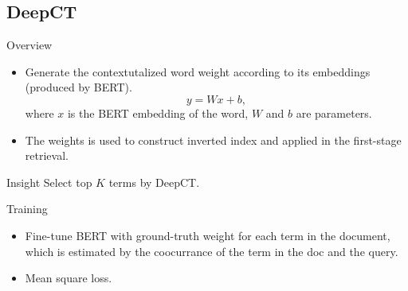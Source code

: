 \documentclass{beamer}
\newenvironment{insight}{\begin{block}{Insight}}{\end{block}}
\begin{document}
\subsection{DeepCT}
\begin{frame}{Overview}
    \begin{itemize}
        \item Generate the contextutalized word weight according to its embeddings (produced by BERT).
        \begin{equation}
            y = Wx + b,
        \end{equation}
        where $x$ is the BERT embedding of the word, $W$ and $b$ are parameters.

        \item The weights is used to construct inverted index and applied in the first-stage retrieval.
    \end{itemize}
    \begin{insight}
        Select top $K$ terms by DeepCT.
    \end{insight}
\end{frame}
\begin{frame}{Training}
    \begin{itemize}
        \item Fine-tune BERT with ground-truth weight for each term in the document, which is estimated by the coocurrance of the term in the doc and the query.
        \item Mean square loss.
    \end{itemize}
\end{frame}
\end{document}
